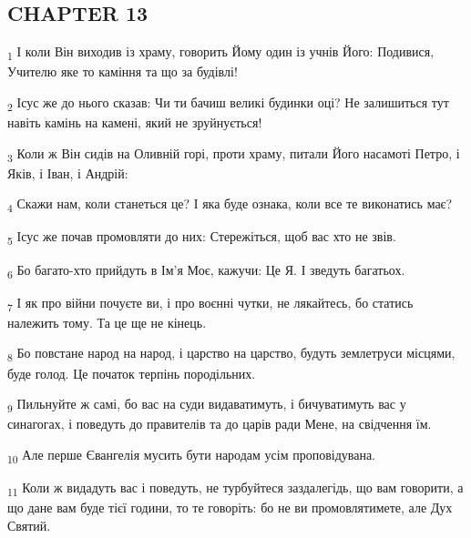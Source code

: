 \subsection{CHAPTER 13}
\begin{tcolorbox}
\textsubscript{1} І коли Він виходив із храму, говорить Йому один із учнів Його: Подивися, Учителю яке то каміння та що за будівлі!
\end{tcolorbox}
\begin{tcolorbox}
\textsubscript{2} Ісус же до нього сказав: Чи ти бачиш великі будинки оці? Не залишиться тут навіть камінь на камені, який не зруйнується!
\end{tcolorbox}
\begin{tcolorbox}
\textsubscript{3} Коли ж Він сидів на Оливній горі, проти храму, питали Його насамоті Петро, і Яків, і Іван, і Андрій:
\end{tcolorbox}
\begin{tcolorbox}
\textsubscript{4} Скажи нам, коли станеться це? І яка буде ознака, коли все те виконатись має?
\end{tcolorbox}
\begin{tcolorbox}
\textsubscript{5} Ісус же почав промовляти до них: Стережіться, щоб вас хто не звів.
\end{tcolorbox}
\begin{tcolorbox}
\textsubscript{6} Бо багато-хто прийдуть в Ім'я Моє, кажучи: Це Я. І зведуть багатьох.
\end{tcolorbox}
\begin{tcolorbox}
\textsubscript{7} І як про війни почуєте ви, і про воєнні чутки, не лякайтесь, бо статись належить тому. Та це ще не кінець.
\end{tcolorbox}
\begin{tcolorbox}
\textsubscript{8} Бо повстане народ на народ, і царство на царство, будуть землетруси місцями, буде голод. Це початок терпінь породільних.
\end{tcolorbox}
\begin{tcolorbox}
\textsubscript{9} Пильнуйте ж самі, бо вас на суди видаватимуть, і бичуватимуть вас у синагогах, і поведуть до правителів та до царів ради Мене, на свідчення їм.
\end{tcolorbox}
\begin{tcolorbox}
\textsubscript{10} Але перше Євангелія мусить бути народам усім проповідувана.
\end{tcolorbox}
\begin{tcolorbox}
\textsubscript{11} Коли ж видадуть вас і поведуть, не турбуйтеся заздалегідь, що вам говорити, а що дане вам буде тієї години, то те говоріть: бо не ви промовлятимете, але Дух Святий.
\end{tcolorbox}
